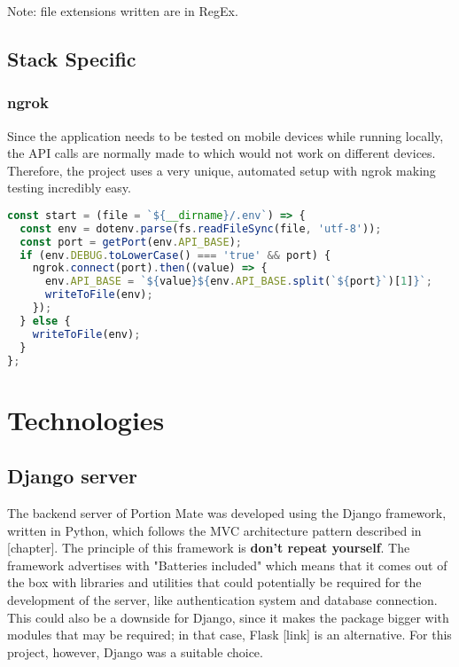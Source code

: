 \documentclass{l4proj}
\begin{document}
Note: file extensions written are in RegEx.

\subsection{Stack Specific}

\subsubsection{ngrok}

Since the application needs to be tested on mobile devices while running locally, the API calls are normally made to  which would not work on different devices. Therefore, the project uses a very unique, automated setup with ngrok making testing incredibly easy.

\begin{lstlisting}[language=javascript, caption={Automatic ngrok connection in \href{https://github.com/ineshbose/portion-mate/blob/c51ee3f32d05df641157467169e9659732202b7b/src/set-env.js\#L26}{\code{./src/set-env.js}}}]
const start = (file = `${__dirname}/.env`) => {
  const env = dotenv.parse(fs.readFileSync(file, 'utf-8'));
  const port = getPort(env.API_BASE);
  if (env.DEBUG.toLowerCase() === 'true' && port) {
    ngrok.connect(port).then((value) => {
      env.API_BASE = `${value}${env.API_BASE.split(`${port}`)[1]}`;
      writeToFile(env);
    });
  } else {
    writeToFile(env);
  }
};
\end{lstlisting}

\section{Technologies}

\subsection{Django server}

The backend server of Portion Mate was developed using the Django framework, written in Python, which follows the MVC architecture pattern described in [chapter]. The principle of this framework is \textbf{don't repeat yourself}. The framework advertises with "Batteries included" which means that it comes out of the box with libraries and utilities that could potentially be required for the development of the server, like authentication system and database connection. This could also be a downside for Django, since it makes the package bigger with modules that may be required; in that case, Flask [link] is an alternative. For this project, however, Django was a suitable choice.
\end{document}
